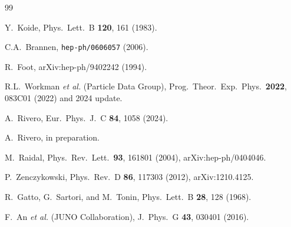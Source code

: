 \documentclass[aps,prl,twocolumn,showpacs,preprintnumbers]{revtex4-2}
\begin{document}
\begin{thebibliography}{99}

  Y.~Koide,
  Phys.\ Lett.\ B \textbf{120}, 161 (1983).

  C.A.~Brannen,
  \texttt{hep-ph/0606057} (2006).

  R.~Foot,
  arXiv:hep-ph/9402242 (1994).

  R.L.~Workman \textit{et al.} (Particle Data Group),
  Prog.\ Theor.\ Exp.\ Phys.\ \textbf{2022}, 083C01 (2022)
  and 2024 update.

  A.~Rivero,
  Eur.\ Phys.\ J.\ C \textbf{84}, 1058 (2024).

  A.~Rivero, in preparation.

  M.~Raidal,
  Phys.\ Rev.\ Lett.\ \textbf{93}, 161801 (2004),
  arXiv:hep-ph/0404046.

  P.~Zenczykowski,
  Phys.\ Rev.\ D \textbf{86}, 117303 (2012),
  arXiv:1210.4125.

  R.~Gatto, G.~Sartori, and M.~Tonin,
  Phys.\ Lett.\ B \textbf{28}, 128 (1968).

  F.~An \textit{et al.} (JUNO Collaboration),
  J.\ Phys.\ G \textbf{43}, 030401 (2016).

\end{thebibliography}
\end{document}
